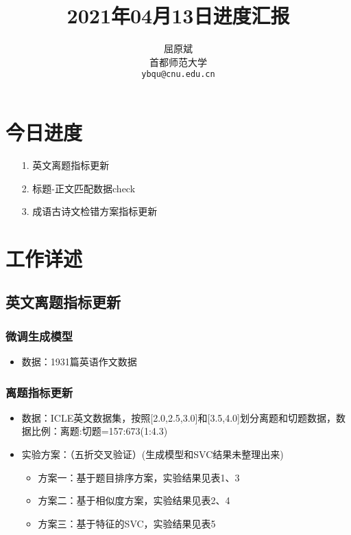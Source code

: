 \documentclass[11pt]{article}
\title{2021年04月13日进度汇报}
\author{屈原斌 \\
  首都师范大学 \\
    {\tt ybqu@cnu.edu.cn}}
\date{}
\begin{document}
\begin{CJK}{UTF8}{gkai}

\maketitle
\CJKindent


\section{今日进度}


\begin{itemize}
  \item [1.] 英文离题指标更新
  \item [2.] 标题-正文匹配数据check
  \item [3.] 成语古诗文检错方案指标更新
\end{itemize}

\section{工作详述}
\subsection{英文离题指标更新}
\subsubsection{微调生成模型}
\begin{itemize}
  \item 数据：1931篇英语作文数据
\end{itemize}

\subsubsection{离题指标更新}
\begin{itemize}
  \item 数据：ICLE英文数据集，按照[2.0,2.5,3.0]和[3.5,4.0]划分离题和切题数据，数据比例：离题:切题=157:673(1:4.3)
  \item 实验方案：（五折交叉验证）(生成模型和SVC结果未整理出来)
  \begin{itemize}
    \item 方案一：基于题目排序方案，实验结果见表1、3
    \item 方案二：基于相似度方案，实验结果见表2、4
    \item 方案三：基于特征的SVC，实验结果见表5
  \end{itemize}
\end{itemize}


\end{CJK}
\end{document}
